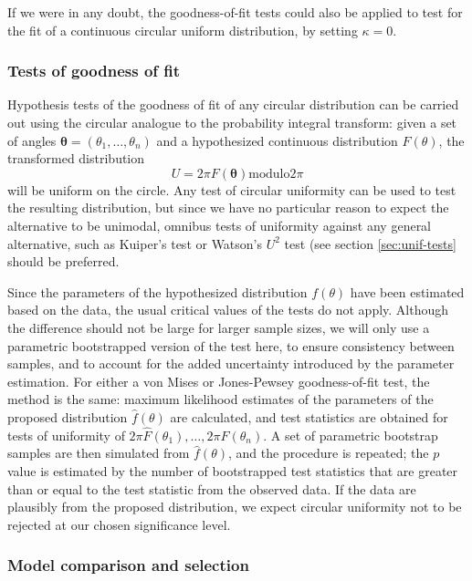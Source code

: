 \documentclass[../../ArchStats.tex]{subfiles}
\begin{document}
If we were in any doubt, the goodness-of-fit tests could also be applied to test for the fit of a continuous circular uniform distribution, by setting $\kappa = 0$.


\subsubsection{Tests of goodness of fit}
\label{sec:GoF}

Hypothesis tests of the goodness of fit of any circular distribution can be carried out using the circular analogue to the probability integral transform: given a set of angles $\mathbf{\theta} = (\theta_1, \dots, \theta_n)$ and a hypothesized continuous distribution $F(\theta)$, the transformed distribution
\[U = 2\pi F(\mathbf{\theta}) \text{modulo} 2\pi\]
will be uniform on the circle. Any test of circular uniformity can be used to test the resulting distribution, but since we have no particular reason to expect the alternative to be unimodal, omnibus tests of uniformity against any general alternative, such as Kuiper's test or Watson's $U^2$ test (see section \ref{sec:unif-tests} should be preferred.

Since the parameters of the hypothesized distribution $f(\theta)$ have been estimated based on the data, the usual critical values of the tests do not apply. Although the difference should not be large for larger sample sizes, we will only use a parametric bootstrapped version of the test here, to ensure consistency between samples, and to account for the added uncertainty introduced by the parameter estimation. For either a von Mises or Jones-Pewsey goodness-of-fit test, the method is the same: maximum likelihood estimates of the parameters of the proposed distribution $\hat{f}(\theta)$ are calculated, and test statistics are obtained for tests of uniformity of $2\pi \hat{F}(\theta_1), \dots, 2\pi \hat{F}(\theta_n)$. A set of parametric bootstrap samples are then simulated from $\hat{f}(\theta)$, and the procedure is repeated; the $p$ value is estimated by the number of bootstrapped test statistics that are greater than or equal to the test statistic from the observed data. If the data are plausibly from the proposed distribution, we expect circular uniformity not to be rejected at our chosen significance level.


\subsubsection{Model comparison and selection}
\label{sec:AIC}
\end{document}
